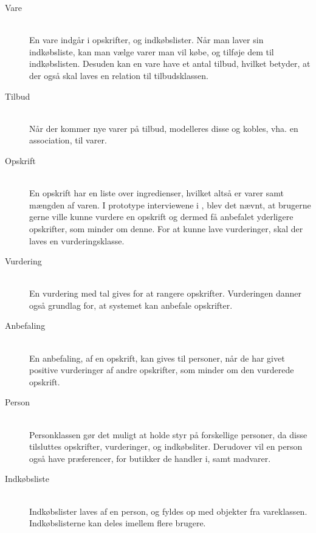 \begin{description}
\item[Vare]\hfill\\
En vare indgår i opskrifter, og indkøbslister.
Når man laver sin indkøbsliste, kan man vælge varer man vil købe, og tilføje dem til indkøbslisten.
Desuden kan en vare have et antal tilbud, hvilket betyder, at der også skal laves en relation til tilbudsklassen.

\item[Tilbud]\hfill\\
Når der kommer nye varer på tilbud, modelleres disse og kobles, vha. en association, til varer.

\item[Opskrift]\hfill\\
En opskrift har en liste over ingredienser, hvilket altså er varer samt mængden af varen.
I prototype interviewene i , blev det nævnt, at brugerne gerne ville kunne vurdere en opskrift og dermed få anbefalet yderligere opskrifter, som minder om denne.
For at kunne lave vurderinger, skal der laves en vurderingsklasse.

\item[Vurdering]\hfill\\
En vurdering med tal gives for at rangere opskrifter. 
Vurderingen danner også grundlag for, at systemet kan anbefale opskrifter.

\item[Anbefaling]\hfill\\
En anbefaling, af en opskrift, kan gives til personer, når de har givet positive vurderinger af andre opskrifter, som minder om den vurderede opskrift.

\item[Person]\hfill\\
Personklassen gør det muligt at holde styr på forskellige personer, da disse tilsluttes opskrifter, vurderinger, og indkøbsliter.
Derudover vil en person også have præferencer, for butikker de handler i, samt madvarer.

\item[Indkøbsliste]\hfill\\
Indkøbslister laves af en person, og fyldes op med objekter fra vareklassen.
Indkøbslisterne kan deles imellem flere brugere.
\end{description}


